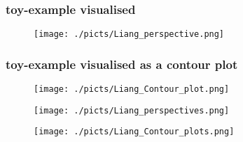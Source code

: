 \begin{frame}
		\frametitle{toy-example visualised}
	
	\begin{center}
		\begin{figure}\texttt{[image: ./picts/Liang\_perspective.png]}\end{figure}	
	\end{center}	
		
\end{frame}

\begin{frame}
		\frametitle{toy-example visualised as a contour plot}
	
	\begin{center}
		\begin{figure}\texttt{[image: ./picts/Liang\_Contour\_plot.png]}\end{figure}	
	\end{center}	
		
\end{frame}


\begin{frame}[plain]

	\begin{center}
		\begin{figure}\texttt{[image: ./picts/Liang\_perspectives.png]}\end{figure}	
	\end{center}	
		
\end{frame}


\begin{frame}[plain]

	\begin{center}
		\begin{figure}\texttt{[image: ./picts/Liang\_Contour\_plots.png]}\end{figure}	
	\end{center}	
		
\end{frame}
